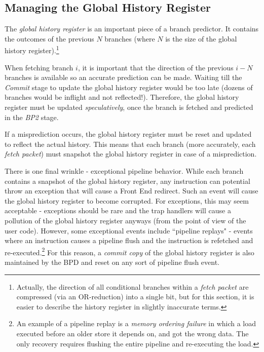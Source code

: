 \subsection{Managing the Global History Register}\label{sec:ghistory}

The {\em global history register} is an important piece of a branch predictor. It contains the outcomes of the previous $N$ branches (where $N$ is the size of the global history register).\footnote{Actually, the direction of all conditional branches within a {\em fetch packet} are compressed (via an OR-reduction) into a single bit, but for this section, it is easier to describe the history register in slightly inaccurate terms.}

When fetching branch $i$, it is important that the direction of the previous $i-N$ branches is available so an accurate prediction can be made.  Waiting till the {\em Commit} stage to update the global history register would be too late (dozens of branches would be inflight and not reflected!). Therefore, the global history register must be updated {\em speculatively}, once the branch is fetched and predicted in the {\em BP2} stage.

If a misprediction occurs, the global history register must be reset and updated to reflect the actual history.  This means that each branch (more accurately, each {\em fetch packet}) must snapshot the global history register in case of a misprediction.

There is one final wrinkle - exceptional pipeline behavior.  While each branch contains a snapshot of the global history register, any instruction can potential throw an exception that will cause a Front End redirect. Such an event will cause the global history register to become corrupted. For exceptions, this may seem acceptable - exceptions should be rare and the trap handlers will cause a pollution of the global history register anyways (from the point of view of the user code).  However, some exceptional events include ``pipeline replays" - events where an instruction causes a pipeline flush and the instruction is refetched and re-executed.\footnote{An example of a pipeline replay is a {\em memory ordering failure} in which a load executed before an older store it depends on, and got the wrong data. The only recovery requires flushing the entire pipeline and re-executing the load.}  For this reason, a {\em commit copy} of the global history register is also maintained by the BPD and reset on any sort of pipeline flush event.

